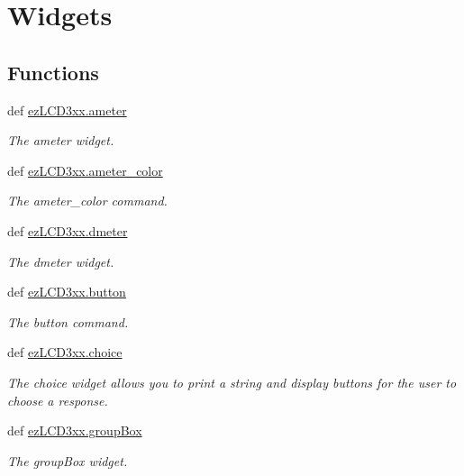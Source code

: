 \hypertarget{group___widgets}{\section{Widgets}
\label{df/d3e/group___widgets}
}
\subsection*{Functions}
\begin{DoxyCompactItemize}
\item 
def \hyperlink{group___widgets_ga01020dc360dfbd9f463bf5478e42566e}{ez\-L\-C\-D3xx.\-ameter}
\begin{DoxyCompactList}\small\item\em The ameter widget. \end{DoxyCompactList}\item 
def \hyperlink{group___widgets_ga87633e350f72285b45b9df28eff6ba18}{ez\-L\-C\-D3xx.\-ameter\-\_\-color}
\begin{DoxyCompactList}\small\item\em The ameter\-\_\-color command. \end{DoxyCompactList}\item 
def \hyperlink{group___widgets_gaa521dbc7f8860a624135caaa58ba516d}{ez\-L\-C\-D3xx.\-dmeter}
\begin{DoxyCompactList}\small\item\em The dmeter widget. \end{DoxyCompactList}\item 
def \hyperlink{group___widgets_ga7eeeb3ce522c7891c3f76cdc79f11192}{ez\-L\-C\-D3xx.\-button}
\begin{DoxyCompactList}\small\item\em The button command. \end{DoxyCompactList}\item 
def \hyperlink{group___widgets_gad1b05a5ee17690c241c30b6a15437c8b}{ez\-L\-C\-D3xx.\-choice}
\begin{DoxyCompactList}\small\item\em The choice widget allows you to print a string and display buttons for the user to choose a response. \end{DoxyCompactList}\item 
def \hyperlink{group___widgets_ga794dde0f8237dcfcd90646e0eeb2ca65}{ez\-L\-C\-D3xx.\-group\-Box}
\begin{DoxyCompactList}\small\item\em The group\-Box widget. \end{DoxyCompactList}\item 

\end{DoxyCompactItemize}
